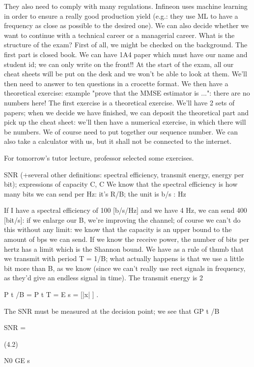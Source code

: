 {{{{{They also need to comply with many regulations.
Infineon uses machine learning in order to ensure a really good production yield (e.g.:
they use ML to have a frequency as close as possible to the desired one).
We can also decide whether we want to continue with a technical career or a managerial career.
What is the structure of the exam?
First of all, we might be checked on the background.
The first part is closed book. We can have 1A4 paper which must have our name and student id; we can only write on the front!!
At the start of the exam, all our cheat sheets will be put on the desk and we won't be able to look at them. We'll then need to answer to ten questions in a crocette format. We then have a theoretical exercise: example "prove that the MMSE estimator is ...": there are no numbers here! The first exercise is a theoretical exercise. We'll have 2 sets of papers; when we decide we have finished, we can deposit the theoretical part and pick up the cheat sheet: we'll then have a numerical exercise, in which there will be numbers.
We of course need to put together our sequence number.
We can also take a calculator with us, but it shall not be connected to the internet.

For tomorrow's tutor lecture, professor selected some exercises.

SNR (+several other definitions: spectral efficiency,
transmit energy, energy per bit); expressions of capacity C, C We know that the spectral efficiency is how many bits we can send per Hz: it's R/B;
the unit is b/s
:
Hz

If I have a spectral efficiency of 100 [b/s/Hz] and we have 4 Hz, we can send 400
[bit/s]: if we enlarge our B, we're improving the channel; of course we can't do this without any limit: we know that the capacity is an upper bound to the amount of bps we can send. If we know the receive power, the number of bits per hertz has a limit which is the Shannon bound.
We have as a rule of thumb that we transmit with period T = 1/B; what actually happens is that we use a little bit more than B, as we know (since we can't really use rect signals in frequency, as they'd give an endless signal in time).
The transmit energy is 2

P t /B = P t T = E s = [|x| ] .

The SNR must be measured at the decision point; we see that GP t /B

SNR =

(4.2)

N0 GE s

}}}}}
